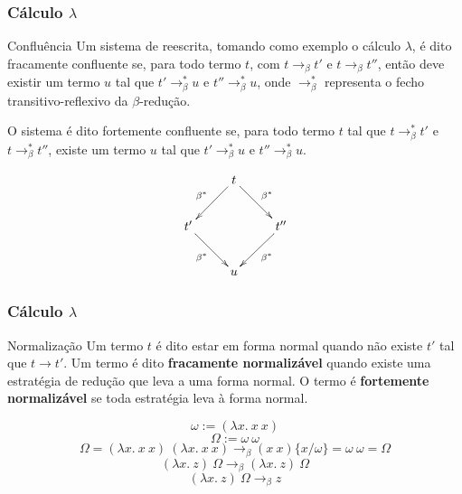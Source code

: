 \documentclass{beamer}
\begin{document}

\begin{frame}
\frametitle{Cálculo $\lambda$}

\begin{block}{ Confluência }
    Um sistema de reescrita, tomando como exemplo o cálculo $\lambda$, é dito
    fracamente confluente se, para todo termo $t$, com $ t \rightarrow_\beta t' $
    e $ t \rightarrow_\beta t'' $, então deve existir um termo $u$ tal que $t'
    \rightarrow_\beta^* u$ e $t'' \rightarrow_\beta^* u$, onde
    $\rightarrow_\beta^*$ representa o fecho transitivo-reflexivo da
    $\beta$-redução.  

    O sistema é dito fortemente confluente se, para todo termo
    $t$ tal que $ t \rightarrow_\beta^* t' $ e $ t \rightarrow_\beta^* t'' $,
    existe um termo $u$ tal que $t' \rightarrow_\beta^* u$ e $t''
    \rightarrow_\beta^* u$. 

\begin{displaymath}
        \xymatrix{                 & t \ar[dl]_{\beta^*} \ar[dr]^{\beta^*} &    \\
                  t' \ar[dr]_{\beta^*} &                & t'' \ar[dl]^{\beta^*} \\
                                   &       u        &                   }
\end{displaymath}
\end{block}

\end{frame}


\begin{frame}
\frametitle{Cálculo $\lambda$}

\begin{block}{ Normalização }
    Um termo $t$ é dito estar em forma normal quando não existe $t'$ tal que $ t
    \rightarrow t' $.  Um termo é dito \textbf{fracamente normalizável} quando
    existe uma estratégia de redução que leva a uma forma normal. O termo é
    \textbf{fortemente normalizável} se toda estratégia leva à forma normal.

    \pause
    \[ \omega := (\lambda x.\ x\ x) \]
    \[ \Omega := \omega\ \omega \]
    \[ \Omega = (\lambda x.\ x\ x)\ (\lambda x.\ x\ x) \rightarrow_{\beta} 
        (x\ x)\{x/\omega\} = \omega\ \omega = \Omega \]
    \pause
    \[ (\lambda x.\ z)\ \Omega \rightarrow_{\beta} (\lambda x.\ z)\ \Omega \]
    \pause
    \[ (\lambda x.\ z)\ \Omega \rightarrow_{\beta} z \]

\end{block}

\end{frame}
\end{document}
